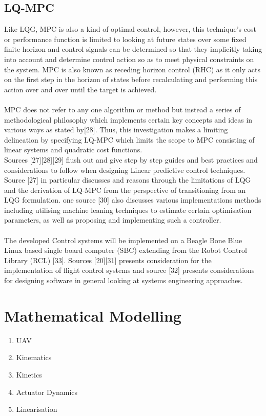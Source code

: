 \documentclass[12pt,a4paper,twoside]{report}
\begin{document}
			\subsection*{LQ-MPC}
				Like LQG, MPC is also a kind of optimal control, however, this technique’s cost or performance function is limited to looking at future states over some fixed finite horizon and control signals can be determined so that they implicitly taking into account and determine control action so as to meet physical constraints on the system. MPC is also known as receding horizon control (RHC) as it only acts on the first step in the horizon of states before recalculating and performing this action over and over until the target is achieved.
				\\ \\
				MPC does not refer to any one algorithm or method but instead a series of methodological philosophy which implements certain key concepts and ideas in various ways as stated by[28]. Thus, this investigation makes a limiting delineation by specifying LQ-MPC which limits the scope to MPC consisting of linear systems and quadratic cost functions.
				\\
				Sources [27][28][29] flush out and give step by step guides and best practices and considerations to follow when designing Linear predictive control techniques. Source [27] in particular discusses and reasons through the limitations of LQG and the derivation of LQ-MPC from the perspective of transitioning from an LQG formulation. one source [30] also discusses various implementations methods including utilising machine leaning techniques to estimate certain optimisation parameters, as well as proposing and implementing such a controller.
				\\ \\
				The developed Control systems will be implemented on a Beagle Bone Blue Linux based single board computer (SBC) extending from the Robot Control Library (RCL) [33]. Sources [20][31] presents consideration for the implementation of flight control systems and source [32] presents considerations for designing software in general looking at systems engineering approaches.
			\newpage
			
	\section{Mathematical Modelling}
		
		\begin{enumerate}
			\item
				UAV
			\item 
				Kinematics 
			\item 
				Kinetics
			\item 
				Actuator Dynamics
			\item 
				Linearisation
		\end{enumerate}
		
\end{document}
